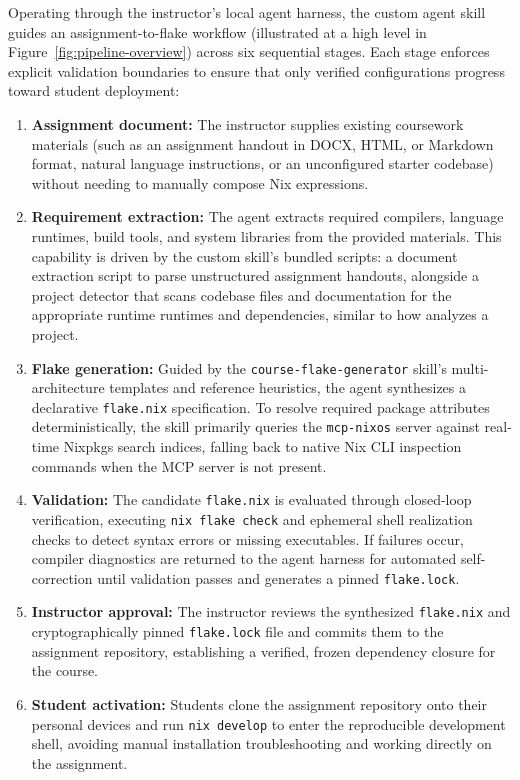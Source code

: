 Operating through the instructor's local agent harness, the custom agent skill guides
an assignment-to-flake workflow (illustrated at a high level in Figure~\ref{fig:pipeline-overview})
across six sequential stages. Each stage enforces explicit validation boundaries
to ensure that only verified configurations progress toward student deployment:
\begin{enumerate}
	\item \textbf{Assignment document:} The instructor supplies existing
	      coursework materials (such as an assignment handout in DOCX, HTML, or Markdown
	      format, natural language instructions, or an unconfigured starter codebase)
	      without needing to manually compose Nix expressions.

	\item \textbf{Requirement extraction:} The agent extracts required compilers,
	      language runtimes, build tools, and system libraries from the provided materials.
	      This capability is driven by the custom skill's bundled scripts: a document
	      extraction script to parse unstructured assignment handouts, alongside a
	      project detector that scans codebase files and documentation for the
	      appropriate runtime runtimes and dependencies, similar to how \cite{schwaighoferVibenixAIAssistant2026}
	      analyzes a project.

	\item \textbf{Flake generation:} Guided by the \texttt{course-flake-generator}
	      skill's multi-architecture templates and reference heuristics, the agent
	      synthesizes a declarative \texttt{flake.nix} specification. To resolve
	      required package attributes deterministically, the skill primarily queries
	      the \texttt{mcp-nixos} server against real-time Nixpkgs search indices, falling
	      back to native Nix CLI inspection commands when the MCP server is not present.

	\item \textbf{Validation:} The candidate \texttt{flake.nix} is evaluated through
	      closed-loop verification, executing \texttt{nix flake check} and ephemeral
	      shell realization checks to detect syntax errors or missing executables.
	      If failures occur, compiler diagnostics are returned to the agent harness
	      for automated self-correction until validation passes and generates a pinned
	      \texttt{flake.lock}.

	\item \textbf{Instructor approval:} The instructor reviews the synthesized
	      \texttt{flake.nix} and cryptographically pinned \texttt{flake.lock} file
	      and commits them to the assignment repository, establishing a verified,
	      frozen dependency closure for the course.

	\item \textbf{Student activation:} Students clone the assignment repository
	      onto their personal devices and run \texttt{nix develop} to enter the reproducible
	      development shell, avoiding manual installation troubleshooting and
	      working directly on the assignment.
\end{enumerate}

